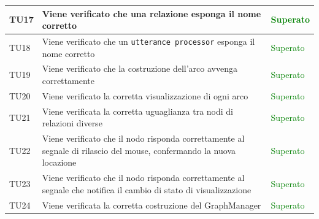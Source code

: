 \documentclass[openany,12pt,a4paper]{report}
\begin{document}
\begin{longtable}[c]{| p{2.5cm} |p{8cm} | p{2.5cm} |}
	\\[1em]
	\hline
	\newline TU17&
	\newline Viene verificato che una relazione esponga il nome corretto&
	\newline \textcolor{green}{Superato}
	\\[1em]
	\hline
	\newline TU18&
	\newline Viene verificato che un \verb|utterance processor| esponga il nome corretto&
	\newline \textcolor{green}{Superato}
	\\[1em]
	\hline
	\newline TU19&
	\newline Viene verificato che la costruzione dell'arco avvenga correttamente&
	\newline \textcolor{green}{Superato}
	\\[1em]
	\hline
	\newline TU20&
	\newline Viene verificato la corretta visualizzazione di ogni arco&
	\newline \textcolor{green}{Superato}
	\\[1em]
	\hline
	\newline TU21&
	\newline Viene verificata la corretta uguaglianza tra nodi di relazioni diverse&
	\newline \textcolor{green}{Superato}
	\\[1em]
	\hline
	\newline TU22&
	\newline Viene verificato che il nodo risponda correttamente al segnale di rilascio del mouse, confermando la nuova locazione&
	\newline \textcolor{green}{Superato}
	\\[1em]
	\hline
	\newline TU23&
	\newline Viene verificato che il nodo risponda correttamente al segnale che notifica il cambio di stato di visualizzazione&
	\newline \textcolor{green}{Superato}
	\\[1em]
	\hline
	\newline TU24&
	\newline Viene verificata la corretta costruzione del GraphManager&
	\newline \textcolor{green}{Superato}
	\\[1em]

\end{longtable}
\end{document}
